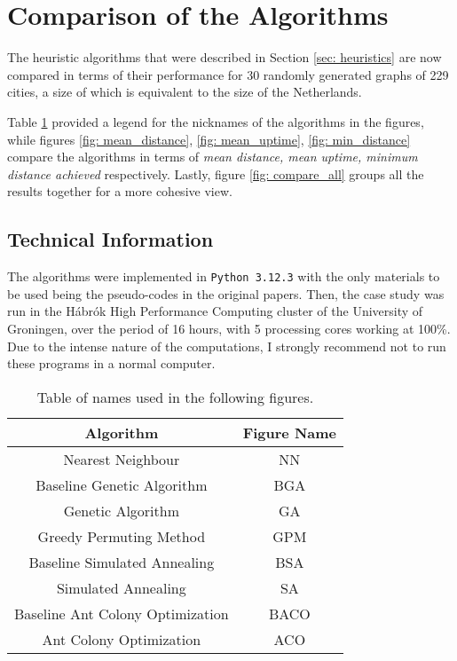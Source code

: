 
\section{Comparison of the Algorithms}
\label{sec: results}
The heuristic algorithms that were described in Section \ref{sec: heuristics} are now compared in terms of their performance for 30 randomly generated graphs of 229 cities, a size of which is equivalent to the size of the Netherlands. 

Table \ref{table: nicknames} provided a legend for the nicknames of the algorithms in the figures, while figures \ref{fig: mean_distance}, \ref{fig: mean_uptime}, \ref{fig: min_distance} compare the algorithms in terms of \textit{mean distance, mean uptime, minimum distance achieved} respectively. Lastly, figure \ref{fig: compare_all} groups all the results together for a more cohesive view.

\subsection{Technical Information}
The algorithms were implemented in \texttt{Python 3.12.3} with the only materials to be used being the pseudo-codes in the original papers. Then, the case study was run in the Hábrók High Performance Computing cluster of the University of Groningen, over the period of 16 hours, with 5 processing cores working at 100\%. Due to the intense nature of the computations, I strongly recommend not to run these programs in a normal computer.

\begin{table}[htbp]
	\centering
	\begin{tabular}{|c|c|}
		\hline
		\textbf{Algorithm}	&	\textbf{Figure Name} \\
		\hline
		Nearest Neighbour  & NN \\
		Baseline Genetic Algorithm	&	BGA	\\
		Genetic Algorithm	&	GA	\\
		Greedy Permuting Method	&	GPM	\\
		Baseline Simulated Annealing	&	BSA	\\
		Simulated Annealing	&	SA	\\
		Baseline Ant Colony Optimization	&	BACO	\\
		Ant Colony Optimization	&	ACO \\
		\hline
	\end{tabular}
	\caption{Table of names used in the following figures.}
	\label{table: nicknames}
\end{table}

